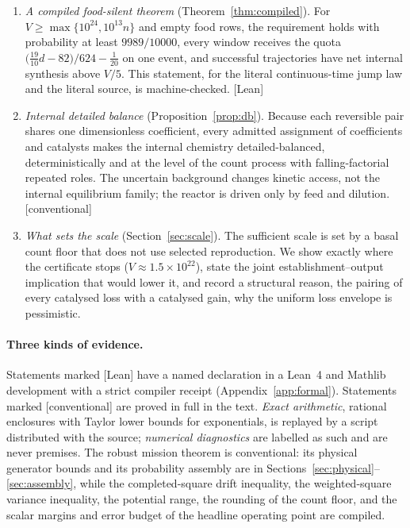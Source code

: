 \documentclass[11pt,letterpaper]{article}
\theoremstyle{plain}
\theoremstyle{definition}
\theoremstyle{remark}
\numberwithin{equation}{section}
\newcommand{\evid}[1]{{\normalfont\small\textsf{[}#1\textsf{]}}}
\begin{document}
\begin{enumerate}[label=(\roman*)]
\item \emph{A compiled food-silent theorem} (Theorem~\ref{thm:compiled}). For $V\ge\max\{10^{24},10^{13}n\}$ and empty food rows, the requirement holds with probability at least $9989/10000$, every window receives the quota $\bigl(\tfrac{19}{10}d-82\bigr)/624-\tfrac1{20}$ on one event, and successful trajectories have net internal synthesis above $V/5$. This statement, for the literal continuous-time jump law and the literal source, is machine-checked. \evid{Lean}
\item \emph{Internal detailed balance} (Proposition~\ref{prop:db}). Because each reversible pair shares one dimensionless coefficient, every admitted assignment of coefficients and catalysts makes the internal chemistry detailed-balanced, deterministically and at the level of the count process with falling-factorial repeated roles. The uncertain background changes kinetic access, not the internal equilibrium family; the reactor is driven only by feed and dilution. \evid{conventional}
\item \emph{What sets the scale} (Section~\ref{sec:scale}). The sufficient scale is set by a basal count floor that does not use selected reproduction. We show exactly where the certificate stops ($V\approx1.5\times10^{22}$), state the joint establishment--output implication that would lower it, and record a structural reason, the pairing of every catalysed loss with a catalysed gain, why the uniform loss envelope is pessimistic.
\end{enumerate}

\paragraph{Three kinds of evidence.}
Statements marked \evid{Lean} have a named declaration in a Lean~4 \cite{demoura2021lean4} and Mathlib \cite{mathlib2020} development with a strict compiler receipt (Appendix~\ref{app:formal}). Statements marked \evid{conventional} are proved in full in the text. \emph{Exact arithmetic}, rational enclosures with Taylor lower bounds for exponentials, is replayed by a script distributed with the source; \emph{numerical diagnostics} are labelled as such and are never premises. The robust mission theorem is conventional: its physical generator bounds and its probability assembly are in Sections~\ref{sec:physical}--\ref{sec:assembly}, while the completed-square drift inequality, the weighted-square variance inequality, the potential range, the rounding of the count floor, and the scalar margins and error budget of the headline operating point are compiled.
\end{document}
